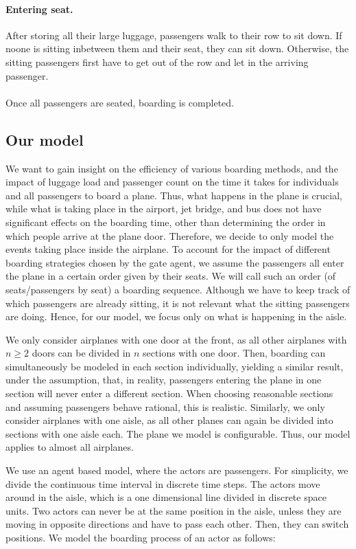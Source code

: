 \documentclass[11pt]{article}
\begin{document}
\paragraph{Entering seat.} After storing all their large luggage, passengers walk to their row to sit down. If noone is sitting inbetween them and their seat, they can sit down. Otherwise, the sitting passengers first have to get out of the row and let in the arriving passenger.
\\\\
Once all passengers are seated, boarding is completed.

\subsection{Our model}\label{ourmodel}

We want to gain insight on the efficiency of various boarding methods, and the impact of luggage load and passenger count on the time it takes for individuals and all passengers to board a plane. Thus, what happens in the plane is crucial, while what is taking place in the airport, jet bridge, and bus does not have significant effects on the boarding time, other than determining the order in which people arrive at the plane door. Therefore, we decide to only model the events taking place inside the airplane. To account for the impact of different boarding strategies chosen by the gate agent, we assume the passengers all enter the plane in a certain order given by their seats. We will call such an order (of seats/passengers by seat) a boarding sequence.
Although we have to keep track of which passengers are already sitting, it is not relevant what the sitting passengers are doing. Hence, for our model, we focus only on what is happening in the aisle.

We only consider airplanes with one door at the front, as all other airplanes with $n \geq 2$ doors can be divided in $n$ sections with one door. Then, boarding can simultaneously be modeled in each section individually, yielding a similar result, under the assumption, that, in reality, passengers entering the plane in one section will never enter a different section.
When choosing reasonable sections and assuming passengers behave rational, this is realistic. Similarly, we only consider airplanes with one aisle, as all other planes can again be divided into sections with one aisle each. The plane we model is configurable. Thus, our model applies to almost all airplanes.

We use an agent based model, where the actors are passengers. For simplicity, we divide the continuous time interval in discrete time steps. The actors move around in the aisle, which is a one dimensional line divided in discrete space units. Two actors can never be at the same position in the aisle, unless they are moving in opposite directions and have to pass each other. Then, they can switch positions. We model the boarding process of an actor as follows:
\end{document}
